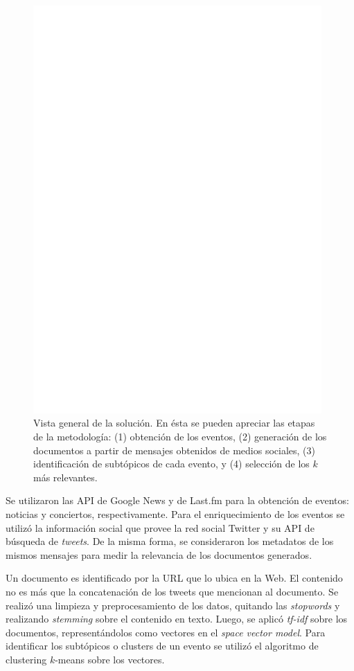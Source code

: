   \begin{figure}[h!b]
  \centering
  \includegraphics[width=11cm]{./dia/model2.ps}
  \caption[Vista general de la solución.]
   {Vista general de la solución\label{fig:overview}. En ésta se
  pueden apreciar las etapas de la metodología: (1) obtención de los
  eventos, (2) generación de los documentos a partir de mensajes
  obtenidos de medios sociales, (3) identificación de subtópicos de
  cada evento, y (4) selección de los $k$ más relevantes.}
  \end{figure}

  Se utilizaron las API de Google News y de Last.fm para la
  obtención de eventos: noticias y conciertos, respectivamente. Para
  el enriquecimiento de los eventos se utilizó la información social
  que provee la red social Twitter y su API de búsqueda de
  \emph{tweets}. De la misma forma, se consideraron los metadatos de los
  mismos mensajes para medir la relevancia de los documentos generados.

  Un documento es identificado por la URL que lo ubica en la Web. El
  contenido no es más que la concatenación de los tweets que
  mencionan al documento. Se realizó una limpieza y preprocesamiento
  de los datos, quitando las \emph{stopwords} y realizando \emph{stemming}
  sobre el contenido en texto. Luego, se aplicó \emph{tf-idf} sobre los
  documentos, representándolos como vectores en el \emph{space vector model}. 
  Para identificar los subtópicos o clusters de un evento se utilizó el
  algoritmo de clustering $k$-means sobre los vectores.

